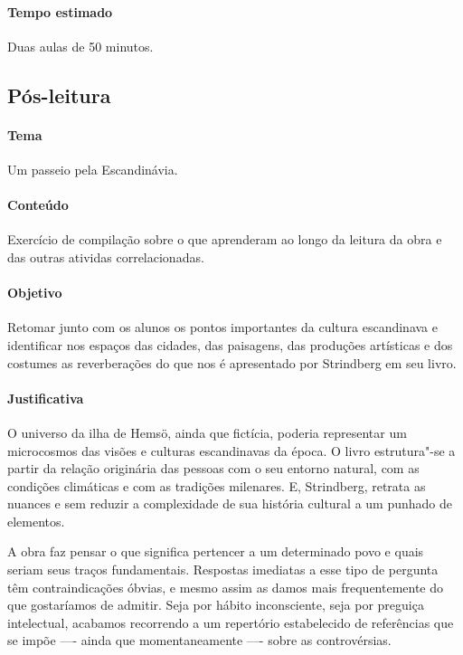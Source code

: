 \documentclass[12pt]{extarticle}
\begin{document}
\paragraph{Tempo estimado} Duas aulas de 50 minutos.


\subsection{Pós-leitura}

\paragraph{Tema} Um passeio pela Escandinávia. 

\paragraph{Conteúdo} Exercício de compilação sobre o que aprenderam ao longo da leitura da obra e das outras 
atividas correlacionadas. 

\paragraph{Objetivo} Retomar junto com os alunos os pontos importantes da cultura escandinava e identificar 
nos espaços das cidades, das paisagens, das produções artísticas e dos costumes as reverberações do que nos 
é apresentado por Strindberg em seu livro. 

\paragraph{Justificativa} O universo da ilha de Hemsö, ainda que fictícia, poderia representar um microcosmos 
das visões e culturas escandinavas da época. O livro estrutura"-se a partir da relação originária das pessoas 
com o seu entorno natural, com as condições climáticas e com as tradições milenares. E, Strindberg, retrata 
as nuances e sem reduzir a complexidade de sua história cultural a um punhado de elementos.

A obra faz pensar o que significa pertencer a um determinado povo e quais seriam seus traços fundamentais. 
Respostas imediatas a esse tipo de pergunta têm contraindicações óbvias, e mesmo assim as damos mais frequentemente 
do que gostaríamos de admitir. Seja por hábito inconsciente, seja por preguiça intelectual, acabamos recorrendo a um 
repertório estabelecido de referências que se impõe —- ainda que momentaneamente —- sobre as controvérsias.
\end{document}
